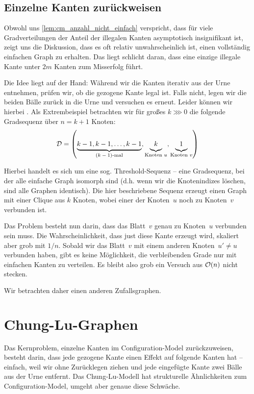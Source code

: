 \subsection{Einzelne Kanten zurückweisen}
Obwohl uns \cref{lem:cm_anzahl_nicht_einfach} verspricht, dass für viele Gradverteilungen der Anteil der illegalen Kanten asymptotisch insignifikant ist, zeigt uns die Diskussion, dass es oft relativ unwahrscheinlich ist, einen vollständig einfachen Graph zu erhalten.
Das liegt schlicht daran, dass eine einzige illegale Kante unter $2m$ Kanten zum Misserfolg führt.

Die Idee liegt auf der Hand:
Während wir die Kanten iterativ aus der Urne entnehmen, prüfen wir, ob die gezogene Kante legal ist.
Falls nicht, legen wir die beiden Bälle zurück in die Urne und versuchen es erneut.
Leider können wir hierbei .
Als Extrembeispiel betrachten wir für großes $k \ggg 0$ die folgende Gradsequenz über $n = k + 1$ Knoten:
\begin{equation}
    \mathcal{D} = \left(
    \underbrace{k-1, k-1, \ldots, k-1\mathstrut}_{\text{($k-1$)-mal}},
    \underbrace{k\mathstrut}_{\text{Knoten $u$}},
    \underbrace{1\mathstrut}_{\text{Knoten $v$}}
    \right)
\end{equation}

Hierbei handelt es sich um eine sog. Threshold-Sequenz -- eine Gradsequenz, bei der alle einfache Graph isomorph sind (d.h. wenn wir die Knotenindizes löschen, sind alle Graphen identisch).
Die hier beschriebene Sequenz erzeugt einen Graph mit einer Clique aus $k$ Knoten, wobei einer der Knoten~$u$ noch zu Knoten~$v$ verbunden ist.

Das Problem besteht nun darin, dass das Blatt~$v$ genau zu Knoten~$u$ verbunden sein muss.
Die Wahrscheinlichkeit, dass just diese Kante erzeugt wird, skaliert aber grob mit $1/n$.
Sobald wir das Blatt~$v$ mit einem anderen Knoten~$u' \ne u$ verbunden haben, gibt es keine Möglichkeit, die verbleibenden Grade nur mit einfachen Kanten zu verteilen.
Es bleibt also grob ein Versuch aus $\mathcal{O}\!\left(n\right)$ nicht stecken.

Wir betrachten daher einen anderen Zufallsgraphen.

\section{Chung-Lu-Graphen}
Das Kernproblem, einzelne Kanten im Configuration-Model zurückzuweisen, besteht darin, dass jede gezogene Kante einen Effekt auf folgende Kanten hat --
einfach, weil wir ohne Zurücklegen ziehen und jede eingefügte Kante zwei Bälle aus der Urne entfernt.
Das Chung-Lu-Modell hat strukturelle Ähnlichkeiten zum Configuration-Model, umgeht aber genaue diese Schwäche.

